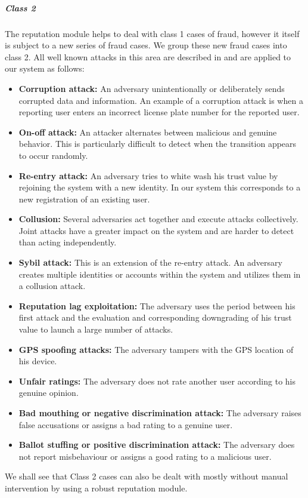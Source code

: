 \subparagraph{Class 2} The reputation module helps to deal with class 1 cases of fraud, however it itself is subject to a new series of fraud cases. We group these new fraud cases into class 2. All well known attacks in this area are described in \cite{mousa2015trust} and are applied to our system as follows:
\begin{itemize}
\item \textbf{Corruption attack:} An adversary unintentionally or deliberately sends corrupted data and information. An example of a corruption attack is when a reporting user enters an incorrect license plate number for the reported user.
\item \textbf{On-off attack:} An attacker alternates between malicious and genuine behavior. This is particularly difficult to detect when the transition appears to occur randomly.
\item \textbf{Re-entry attack:} An adversary tries to white wash his trust value by rejoining the system with a new identity. In our system this corresponds to a new registration of an existing user.
\item \textbf{Collusion:} Several adversaries act together and execute attacks collectively. Joint attacks have a greater impact on the system and are harder to detect than acting independently.
\item \textbf{Sybil attack:} This is an extension of the re-entry attack. An adversary creates multiple identities or accounts within the system and utilizes them in a collusion attack.
\item \textbf{Reputation lag exploitation:} The adversary uses the period between his first attack and the evaluation and corresponding downgrading of his trust value to launch a large number of attacks.
\item \textbf{GPS spoofing attacks:} The adversary tampers with the GPS location of his device.
\item \textbf{Unfair ratings:} The adversary does not rate another user according to his genuine opinion.
\item \textbf{Bad mouthing or negative discrimination attack:} The adversary raises false accusations or assigns a bad rating to a genuine user.
\item \textbf{Ballot stuffing or positive discrimination attack:} The adversary does not report misbehaviour or assigns a good rating to a malicious user.
\end{itemize}
We shall see that Class 2 cases can also be dealt with mostly without manual intervention by using a robust reputation module. 

